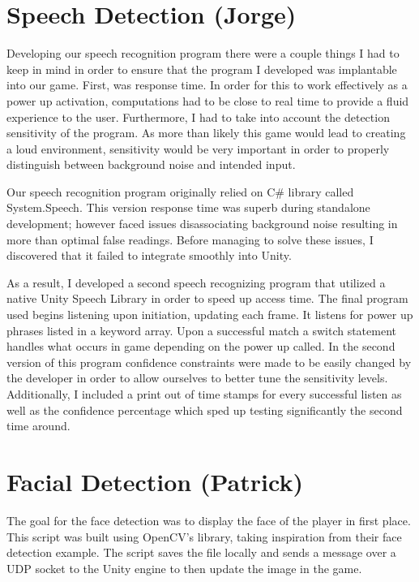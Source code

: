 \documentclass[a4paper,10pt]{article}
\begin{document}
\section{Speech Detection (Jorge)}
Developing our speech recognition program there were a couple things I had to keep in mind in order to ensure that the program I developed was implantable into our game. First, was response time. In order for this to work effectively as a power up activation, computations had to be close to real time to provide a fluid experience to the user. Furthermore, I had to take into account the detection sensitivity of the program. As more than likely this game would lead to creating a loud environment, sensitivity would be very important in order to properly distinguish between background noise and intended input. 
 
Our speech recognition program originally relied on C\# library called System.Speech. This version response time was superb during standalone development; however faced issues disassociating background noise resulting in more than optimal false readings. Before managing to solve these issues, I discovered that it failed to integrate smoothly into Unity. 
 
As a result, I developed a second speech recognizing program that utilized a native Unity Speech Library in order to speed up access time. The final program used begins listening upon initiation, updating each frame. It listens for power up phrases listed in a keyword array. Upon a successful match a switch statement handles what occurs in game depending on the power up called. In the second version of this program confidence constraints were made to be easily changed by the developer in order to allow ourselves to better tune the sensitivity levels. Additionally, I included a print out of time stamps for every successful listen as well as the confidence percentage which sped up testing significantly the second time around. 

\section{Facial Detection (Patrick)}
The goal for the face detection was to display the face of the player in first place. This script was built using OpenCV's library, taking inspiration from their face detection example. The script saves the file locally and sends a message over a UDP socket to the Unity engine to then update the image in the game. 
\end{document}
